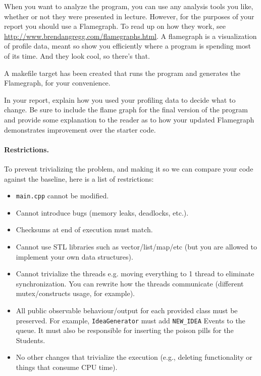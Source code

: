 \documentclass[letterpaper,10pt]{article}
\begin{document}
When you want to analyze the program, you can use any analysis tools you like, whether or not they were presented in lecture. However, for the purposes of your report you should use a Flamegraph. To read up on how they work, see \url{http://www.brendangregg.com/flamegraphs.html}. A flamegraph is a visualization of profile data, meant so show you efficiently where a program is spending most of its time. And they look cool, so there's that.

A makefile target has been created that runs the program and generates the Flamegraph, for your convenience.

In your report, explain how you used your profiling data to decide what to change. Be sure to include the flame graph for the final version of the program and provide some explanation to the reader as to how your updated Flamegraph demonstrates improvement over the starter code.

\paragraph{Restrictions.}

To prevent trivializing the problem, and making it so we can compare your code against the baseline, here is a list of restrictions:

\begin{itemize}
\item \texttt{main.cpp} cannot be modified.
\item Cannot introduce bugs (memory leaks, deadlocks, etc.).
\item Checksums at end of execution must match.
\item  Cannot use STL libraries such as vector/list/map/etc (but you are allowed to implement your own data structures).
\item  Cannot trivialize the threads e.g. moving everything to 1 thread to
eliminate synchronization. You can rewrite how the threads
communicate (different mutex/constructs usage, for example).
\item All public observable behaviour/output for each provided class must be
preserved. For example, \texttt{IdeaGenerator} must add \texttt{NEW\_IDEA} Events to the queue. It must also be responsible for inserting the poison pills for the Students.
\item No other changes that trivialize the execution (e.g., deleting functionality or things that consume CPU time).
\end{itemize}
\end{document}
